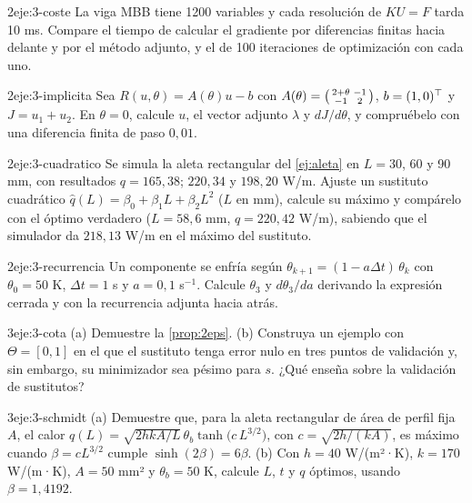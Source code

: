 \begin{ejercicio}{2}{eje:3-coste}
La viga MBB tiene 1200 variables y cada resolución de $KU=F$ tarda 10 ms. Compare el tiempo de calcular el gradiente por diferencias finitas hacia delante y por el método adjunto, y el de 100 iteraciones de optimización con cada uno.
\end{ejercicio}

\begin{ejercicio}{2}{eje:3-implicita}
Sea $R(u,\theta)=A(\theta)u-b$ con $A(\theta)=\begin{psmallmatrix}2+\theta&-1\\-1&2\end{psmallmatrix}$, $b=(1,0)^\top$ y $J=u_1+u_2$. En $\theta=0$, calcule $u$, el vector adjunto $\lambda$ y $dJ/d\theta$, y compruébelo con una diferencia finita de paso $0{,}01$.
\end{ejercicio}

\begin{ejercicio}{2}{eje:3-cuadratico}
Se simula la aleta rectangular del \cref{ej:aleta} en $L=30$, 60 y 90 mm, con resultados $q=165{,}38$; $220{,}34$ y $198{,}20$ W/m. Ajuste un sustituto cuadrático $\hat q(L)=\beta_0+\beta_1L+\beta_2L^2$ ($L$ en mm), calcule su máximo y compárelo con el óptimo verdadero ($L=58{,}6$ mm, $q=220{,}42$ W/m), sabiendo que el simulador da $218{,}13$ W/m en el máximo del sustituto.
\end{ejercicio}

\begin{ejercicio}{2}{eje:3-recurrencia}
Un componente se enfría según $\theta_{k+1}=(1-a\Delta t)\,\theta_k$ con $\theta_0=50$ K, $\Delta t=1$ s y $a=0{,}1$ s$^{-1}$. Calcule $\theta_3$ y $d\theta_3/da$ derivando la expresión cerrada y con la recurrencia adjunta hacia atrás.
\end{ejercicio}

\begin{ejercicio}{3}{eje:3-cota}
(a) Demuestre la \cref{prop:2eps}. (b) Construya un ejemplo con $\Theta=[0,1]$ en el que el sustituto tenga error nulo en tres puntos de validación y, sin embargo, su minimizador sea pésimo para $s$. ¿Qué enseña sobre la validación de sustitutos?
\end{ejercicio}

\begin{ejercicio}{3}{eje:3-schmidt}
(a) Demuestre que, para la aleta rectangular de área de perfil fija $A$, el calor $q(L)=\sqrt{2hkA/L}\,\theta_b\tanh\bigl(c\,L^{3/2}\bigr)$, con $c=\sqrt{2h/(kA)}$, es máximo cuando $\beta=cL^{3/2}$ cumple $\sinh(2\beta)=6\beta$. (b) Con $h=40$ W/(m²·K), $k=170$ W/(m·K), $A=50$ mm² y $\theta_b=50$ K, calcule $L$, $t$ y $q$ óptimos, usando $\beta=1{,}4192$.
\end{ejercicio}
